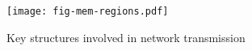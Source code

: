 \begin{figure}[t]
\texttt{[image: fig-mem-regions.pdf]}
\caption{Key structures involved in network transmission}
\label{fig:mem-regions}
\end{figure}
